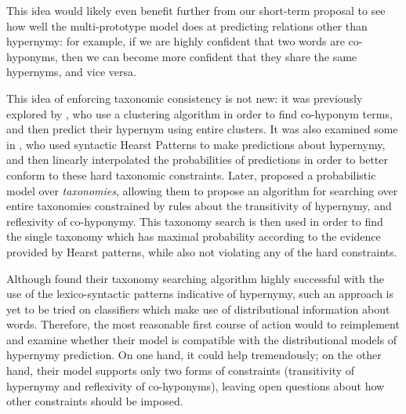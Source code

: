 \documentclass[letterpaper]{article}
\begin{document}
This idea would likely even benefit further from our short-term proposal to
see how well the multi-prototype model does at predicting relations other
than hypernymy: for example, if we are highly confident that two words are
co-hyponyms, then we can become more confident that they share the same
hypernyms, and vice versa.

This idea of enforcing taxonomic consistency is not new: it was previously
explored by , who use a clustering algorithm in
order to find co-hyponym terms, and then predict their hypernym using entire
clusters. It was also examined some in , who used
syntactic Hearst Patterns to make predictions about hypernymy, and then
linearly interpolated the probabilities of predictions in order to better
conform to these hard taxonomic constraints. Later, 
proposed a probabilistic model over {\em taxonomies}, allowing them to propose
an algorithm for searching over entire taxonomies constrained by rules about
the transitivity of hypernymy, and reflexivity of co-hyponymy. This taxonomy
search is then used in order to find the single taxonomy which has maximal
probability according to the evidence provided by Hearst patterns, while also
not violating any of the hard constraints.

Although  found their taxonomy searching algorithm
highly successful with the use of the lexico-syntactic patterns indicative
of hypernymy, such an approach is yet to be tried on classifiers which make
use of distributional information about words. Therefore, the most reasonable
first course of action would to reimplement and examine whether their model
is compatible with the distributional models of hypernymy prediction. On one
hand, it could help tremendously; on the other hand, their model supports only
two forms of constraints (transitivity of hypernymy and reflexivity of
co-hyponyms), leaving open questions about how other constraints should be
imposed.
\end{document}
